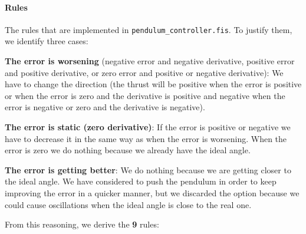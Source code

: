 \documentclass{article}[11pt]
\begin{document}
\paragraph{Rules} The rules that are implemented in \texttt{pendulum\_controller.fis}. To justify them, we identify three cases:
\begin{enumerate*}
    \item \textbf{The error is worsening} (negative error and negative derivative, positive error and positive derivative, or zero error and positive or negative derivative): We have to change the direction (the thrust will be positive when the error is positive or when the error is zero and the derivative is positive and negative when the error is negative or zero and the derivative is negative).
     \item \textbf{The error is static (zero derivative)}: If the error is positive or negative we have to decrease it in the same way as when the error is worsening. When the error is zero we do nothing because we already have the ideal angle.
     \item \textbf{The error is getting better}: We do nothing because we are getting closer to the ideal angle. We have considered to push the pendulum in order to keep improving the error in a quicker manner, but we discarded the option because we could cause oscillations when the ideal angle is close to the real one.
\end{enumerate*} From this reasoning, we derive the \textbf{9} rules:
\end{document}
